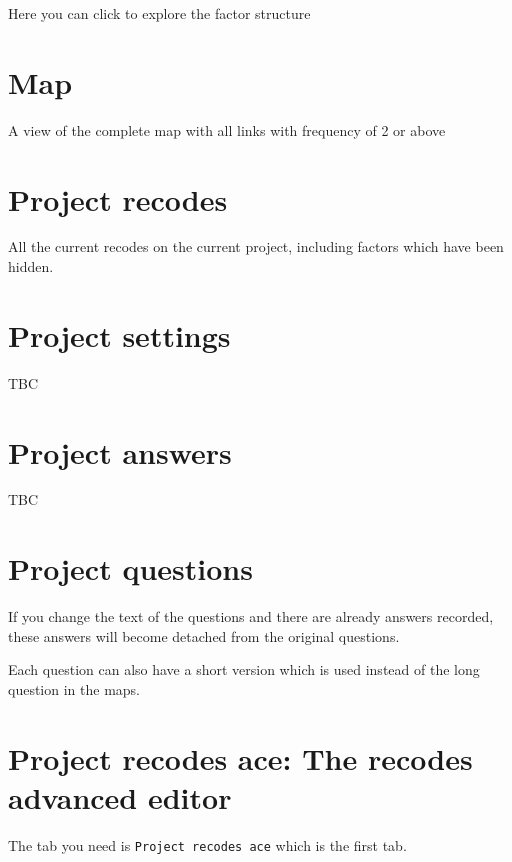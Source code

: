 \documentclass[
]{book}
\begin{document}
Here you can click to explore the factor structure

\hypertarget{map}{%
\section{Map}\label{map}}

A view of the complete map with all links with frequency of 2 or above

\hypertarget{project-recodes}{%
\section{Project recodes}\label{project-recodes}}

All the current recodes on the current project, including factors which have been hidden.

\hypertarget{project-settings}{%
\section{Project settings}\label{project-settings}}

TBC

\hypertarget{project-answers}{%
\section{Project answers}\label{project-answers}}

TBC

\hypertarget{project-questions}{%
\section{Project questions}\label{project-questions}}

If you change the text of the questions and there are already answers recorded, these answers will become detached from the original questions.

Each question can also have a short version which is used instead of the long question in the maps.

\hypertarget{project-recodes-ace-the-recodes-advanced-editor}{%
\section{Project recodes ace: The recodes advanced editor}\label{project-recodes-ace-the-recodes-advanced-editor}}

The tab you need is \texttt{Project\ recodes\ ace} which is the first tab.
\end{document}
